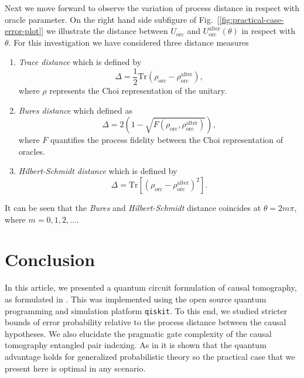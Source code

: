 \documentclass[
 aps,
 jmp,
 amsmath,amssymb,
 reprint,
]{revtex4-2}
\begin{document}
Next we move forward to observe the variation of process distance in respect with oracle parameter. On the right hand side subfigure of Fig.~[\ref{fig:practical-case-error-plot}] we illustrate the distance between $U_\textrm{orc}$ and $U_\textrm{orc}^\textrm{alter}(\theta)$ in respect with $\theta$. For this investigation we have considered three distance measures
\begin{enumerate}%
	\item \textit{Trace distance} which is defined by 
	\begin{equation}
	\Delta = \frac{1}{2}\textrm{Tr}\left(\rho_\textrm{orc}-\rho_\textrm{orc}^\textrm{alter}\right),
	\end{equation}
	where $\rho$ represents the Choi representation of the unitary.
	\item \textit{Bures distance} which defined as 
	\begin{equation}
	\Delta = 2\left(1-\sqrt{F(\rho_\textrm{orc},\rho_\textrm{orc}^\textrm{alter})}\right),
	\end{equation}
	where $F$ quantifies the process fidelity between the Choi representation of oracles.
	\item \textit{Hilbert-Schmidt distance} which is defined by 
	\begin{equation}
	\Delta = \textrm{Tr}\left[\left(\rho_\textrm{orc} - \rho_\textrm{orc}^\textrm{alter}\right)^2\right].
	\end{equation}
\end{enumerate}
It can be seen that the \textit{Bures} and \textit{Hilbert-Schmidt} distance coincides at $\theta=2m\pi$, where $m=0,1,2,\ldots$. 

\section{Conclusion} \label{sec:conclusion}

In this article, we presented a quantum circuit formulation of causal tomography, as formulated in \cite{chiribella2019quantum}.
This was implemented using the open source quantum programming and simulation platform \texttt{qiskit}.
To this end, we studied stricter bounds of error probability relative to the process distance between the causal hypotheses.
We also elucidate the pragmatic gate complexity of the causal tomography entangled pair indexing. As in \cite{chiribella2019quantum} it is shown that the quantum advantage holds for generalized probabilistic theory so the practical case that we present here is optimal in any scenario.
\end{document}
